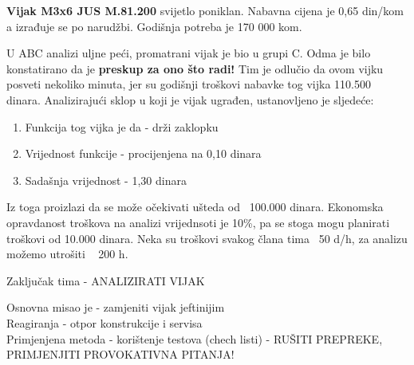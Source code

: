 \documentclass[a4paper,12pt]{article}
\numberwithin{figure}{section}
\begin{document}
\textbf{Vijak M3x6 JUS M.81.200} svijetlo poniklan. Nabavna cijena je 0,65 din/kom a izrađuje se po narudžbi. Godišnja potreba je 170 000 kom.
\begin{figure}
  \vspace{-20pt}
  \begin{center}
    
  \end{center}
  \vspace{-20pt}
  \vspace{-10pt}
\end{figure}
U ABC analizi uljne peći, promatrani vijak je bio u grupi C. Odma je bilo konstatirano da je \textbf{preskup za ono što radi!} Tim je odlučio da ovom vijku posveti nekoliko minuta, jer su godišnji troškovi nabavke tog vijka 110.500 dinara. Analizirajući sklop u koji je vijak ugrađen, ustanovljeno je sljedeće:
\begin{enumerate}
\item Funkcija tog vijka je da - drži zaklopku
\item Vrijednost funkcije - procijenjena na 0,10 dinara
\item Sadašnja vrijednost - 1,30 dinara
\end{enumerate} 
Iz toga proizlazi da se može očekivati ušteda od ~100.000 dinara. Ekonomska opravdanost troškova na analizi vrijednsoti je 10\%, pa se stoga mogu planirati troškovi od 10.000 dinara. Neka su troškovi svakog člana tima ~50 d/h, za analizu možemo utrošiti ~ 200 h.
\begin{center}
Zaključak tima - ANALIZIRATI VIJAK
\end{center}
Osnovna misao je - zamjeniti vijak jeftinijim\\
Reagiranja - otpor konstrukcije i servisa\\
Primjenjena metoda - korištenje testova (chech listi) - RUŠITI PREPREKE, PRIMJENJITI PROVOKATIVNA PITANJA!
\end{document}
